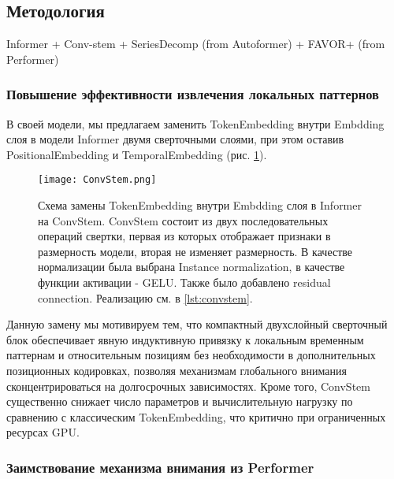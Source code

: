 \subsection{Методология}

{\color{red} Informer + Conv-stem + SeriesDecomp (from Autoformer) + FAVOR+ (from Performer)}

\subsubsection{Повышение эффективности извлечения локальных паттернов}

В своей модели, мы предлагаем заменить TokenEmbedding внутри Embdding слоя 
в модели Informer двумя сверточными слоями, при этом оставив PositionalEmbedding 
и TemporalEmbedding (рис. \ref{fig:convstem}).

\begin{figure}[h!]
    \centering
    \texttt{[image: ConvStem.png]}
    \caption{Схема замены TokenEmbedding внутри Embdding слоя в Informer на ConvStem. 
    ConvStem состоит из двух последовательных операций свертки, первая из которых 
    отображает признаки в размерность модели, вторая не изменяет размерность. В 
    качестве нормализации была выбрана Instance normalization, в качестве функции активации 
    - GELU. Также было добавлено residual connection. Реализацию см. в \ref{lst:convstem}.}
    \label{fig:convstem}
\end{figure}

Данную замену мы мотивируем тем, что компактный двухслойный сверточный блок 
обеспечивает явную индуктивную привязку к локальным временным паттернам и 
относительным позициям без необходимости в дополнительных позиционных кодировках, 
позволяя механизмам глобального внимания сконцентрироваться на долгосрочных зависимостях. 
Кроме того, ConvStem существенно снижает число параметров и вычислительную нагрузку 
по сравнению с классическим TokenEmbedding, что критично при ограниченных ресурсах GPU.

\subsubsection{Заимствование механизма внимания из Performer}


